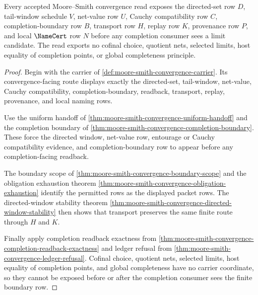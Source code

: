 \begin{theorem}
\label{thm:moore-smith-directed-window-obligation}
Every accepted Moore--Smith convergence read exposes the directed-set row $D$, tail-window schedule $V$, net-value row $U$, Cauchy compatibility row $C$, completion-boundary row $B$, transport row $H$, replay row $K$, provenance row $P$, and local $\NameCert$ row $N$ before any completion consumer sees a limit candidate. The read exports no cofinal choice, quotient nets, selected limits, host equality of completion points, or global completeness principle.
\end{theorem}
\begin{proof}
Begin with the carrier of \autoref{def:moore-smith-convergence-carrier}. Its convergence-facing route displays exactly the directed-set, tail-window, net-value, Cauchy compatibility, completion-boundary, readback, transport, replay, provenance, and local naming rows.

Use the uniform handoff of \autoref{thm:moore-smith-convergence-uniform-handoff} and the completion boundary of \autoref{thm:moore-smith-convergence-completion-boundary}. These force the directed window, net-value row, entourage or Cauchy compatibility evidence, and completion-boundary row to appear before any completion-facing readback.

The boundary scope of \autoref{thm:moore-smith-convergence-boundary-scope} and the obligation exhaustion theorem \autoref{thm:moore-smith-convergence-obligation-exhaustion} identify the permitted rows as the displayed packet rows. The directed-window stability theorem \autoref{thm:moore-smith-convergence-directed-window-stability} then shows that transport preserves the same finite route through $H$ and $K$.

Finally apply completion readback exactness from \autoref{thm:moore-smith-convergence-completion-readback-exactness} and ledger refusal from \autoref{thm:moore-smith-convergence-ledger-refusal}. Cofinal choice, quotient nets, selected limits, host equality of completion points, and global completeness have no carrier coordinate, so they cannot be exposed before or after the completion consumer sees the finite boundary row.
\end{proof}

